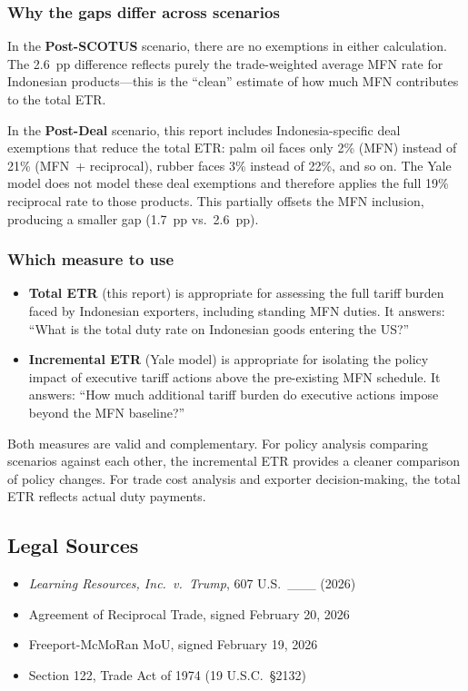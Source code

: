 \documentclass[12pt,a4paper]{article}
\begin{document}
\subsubsection*{Why the gaps differ across scenarios}

In the \textbf{Post-SCOTUS} scenario, there are no exemptions in either calculation. The 2.6~pp difference reflects purely the trade-weighted average MFN rate for Indonesian products---this is the ``clean'' estimate of how much MFN contributes to the total ETR.

In the \textbf{Post-Deal} scenario, this report includes Indonesia-specific deal exemptions that reduce the total ETR: palm oil faces only 2\% (MFN) instead of 21\% (MFN~+ reciprocal), rubber faces 3\% instead of 22\%, and so on. The Yale model does not model these deal exemptions and therefore applies the full 19\% reciprocal rate to those products. This partially offsets the MFN inclusion, producing a smaller gap (1.7~pp vs.\ 2.6~pp).

\subsubsection*{Which measure to use}

\begin{itemize}
    \item \textbf{Total ETR} (this report) is appropriate for assessing the full tariff burden faced by Indonesian exporters, including standing MFN duties. It answers: ``What is the total duty rate on Indonesian goods entering the US?''
    \item \textbf{Incremental ETR} (Yale model) is appropriate for isolating the policy impact of executive tariff actions above the pre-existing MFN schedule. It answers: ``How much additional tariff burden do executive actions impose beyond the MFN baseline?''
\end{itemize}

\noindent Both measures are valid and complementary. For policy analysis comparing scenarios against each other, the incremental ETR provides a cleaner comparison of policy changes. For trade cost analysis and exporter decision-making, the total ETR reflects actual duty payments.

\subsection*{Legal Sources}
\begin{itemize}
    \item \textit{Learning Resources, Inc.\ v.\ Trump}, 607 U.S.\ \_\_\_ (2026)
    \item Agreement of Reciprocal Trade, signed February 20, 2026
    \item Freeport-McMoRan MoU, signed February 19, 2026
    \item Section 122, Trade Act of 1974 (19 U.S.C.\ \S 2132)
\end{itemize}
\end{document}
